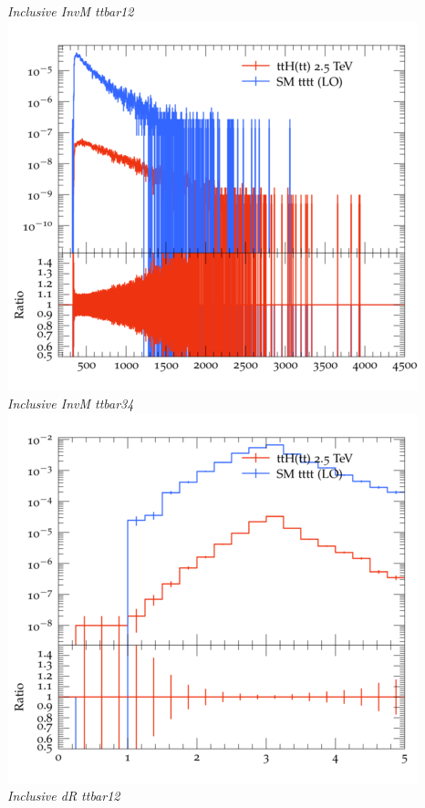 \documentclass{beamer}
\begin{document}
\begin{frame}
\begin{columns}
\textit{\small Inclusive InvM ttbar12}
\includegraphics[width=\textwidth]{../plots/ttH_2500/tttt_ttH/Inclusive_InvM_ttbar34.png}\\
\textit{\small Inclusive InvM ttbar34}
\includegraphics[width=\textwidth]{../plots/ttH_2500/tttt_ttH/Inclusive_dR_ttbar12.png}\\
\textit{\small Inclusive dR ttbar12}
\end{columns}
\end{frame}
\end{document}
